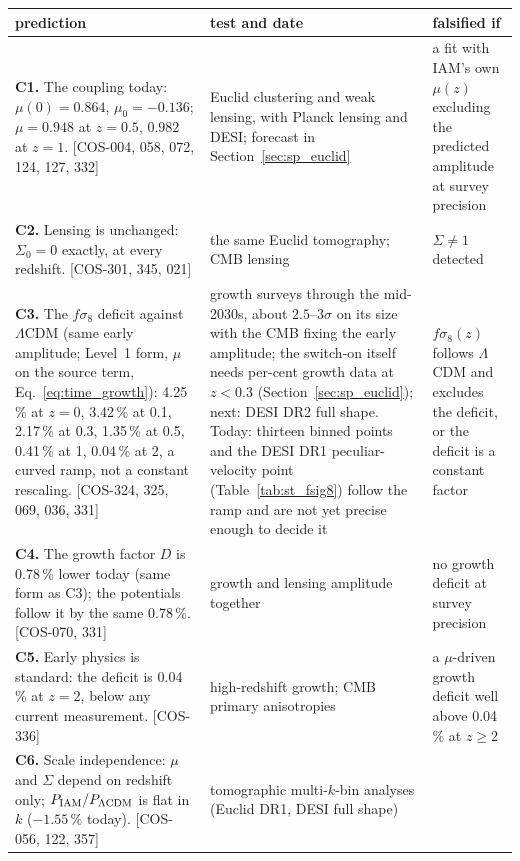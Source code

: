 {\small\begin{longtable}{@{}>{\raggedright\arraybackslash}p{}>{\raggedright\arraybackslash}p{}>{\raggedright\arraybackslash}p{}@{}}
\toprule
prediction & test and date & falsified if \\\midrule\endhead
\textbf{C1.} \Spending{} The coupling today: $\mu(0)=0.864$, $\mu_0=-0.136$; $\mu=0.948$ at $z=0.5$, $0.982$ at $z=1$. [COS-004, 058, 072, 124, 127, 332]
 & Euclid clustering and weak lensing, with Planck lensing and DESI; forecast in Section~\ref{sec:sp_euclid}
 & a fit with IAM's own $\mu(z)$ excluding the predicted amplitude at survey precision \\
\textbf{C2.} \Spending{} Lensing is unchanged: $\Sigma_0=0$ exactly, at every redshift. [COS-301, 345, 021]
 & the same Euclid tomography; CMB lensing
 & $\Sigma\ne1$ detected \\ \cmidrule{1-3}
\textbf{C3.} \Spending{} The $f\sigma_8$ deficit against $\Lambda$CDM (same early amplitude; Level~1 form, $\mu$ on the source term, Eq.~\eqref{eq:time_growth}): 4.25\,\% at $z=0$, 3.42\,\% at 0.1, 2.17\,\% at 0.3, 1.35\,\% at 0.5,
 0.41\,\% at 1, 0.04\,\% at 2, a curved ramp, not a constant rescaling. [COS-324, 325, 069, 036, 331]
 & growth surveys through the mid-2030s, about $2.5$--$3\sigma$ on its size with the CMB fixing the early amplitude; the switch-on itself needs per-cent
 growth data at $z<0.3$ (Section~\ref{sec:sp_euclid}); next: DESI DR2 full shape. Today: thirteen binned points and the DESI DR1 peculiar-velocity
 point (Table~\ref{tab:st_fsig8}) follow the ramp and are not yet precise enough to decide it
 & $f\sigma_8(z)$ follows $\Lambda$CDM and excludes the deficit, or the deficit is a constant factor \\
\textbf{C4.} \Spending{} The growth factor $D$ is 0.78\,\% lower today (same form as C3); the potentials follow it by the same 0.78\,\%. [COS-070, 331]
 & growth and lensing amplitude together
 & no growth deficit at survey precision \\ \cmidrule{1-3}
\textbf{C5.} \Spending{} Early physics is standard: the deficit is 0.04\,\% at $z=2$, below any current measurement. [COS-336]
 & high-redshift growth; CMB primary anisotropies
 & a $\mu$-driven growth deficit well above 0.04\,\% at $z\ge2$ \\ \cmidrule{1-3}
\textbf{C6.} \Spending{} Scale independence: $\mu$ and $\Sigma$ depend on redshift only; $P_{\rm IAM}/P_{\Lambda\rm CDM}$ is flat in $k$ ($-1.55$\,\% today). [COS-056, 122, 357]
 & tomographic multi-$k$-bin analyses (Euclid DR1, DESI full shape)

\end{longtable}}
